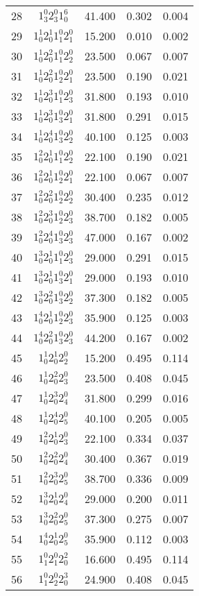 \begin{table}
\begin{tabular}{rcrrr}
28&$1_3^0 2_3^0 1_0^6$& 41.400& 0.302& 0.004\\
29&$1_0^1 2_0^1 1_1^0 2_1^0$& 15.200& 0.010& 0.002\\
30&$1_0^1 2_0^2 1_1^0 2_2^0$& 23.500& 0.067& 0.007\\
31&$1_0^1 2_0^2 1_2^0 2_1^0$& 23.500& 0.190& 0.021\\
32&$1_0^1 2_0^3 1_1^0 2_3^0$& 31.800& 0.193& 0.010\\
33&$1_0^1 2_0^3 1_3^0 2_1^0$& 31.800& 0.291& 0.015\\
34&$1_0^1 2_0^4 1_3^0 2_2^0$& 40.100& 0.125& 0.003\\
35&$1_0^2 2_0^1 1_1^0 2_2^0$& 22.100& 0.190& 0.021\\
36&$1_0^2 2_0^1 1_2^0 2_1^0$& 22.100& 0.067& 0.007\\
37&$1_0^2 2_0^2 1_2^0 2_2^0$& 30.400& 0.235& 0.012\\
38&$1_0^2 2_0^3 1_2^0 2_3^0$& 38.700& 0.182& 0.005\\
39&$1_0^2 2_0^4 1_3^0 2_3^0$& 47.000& 0.167& 0.002\\
40&$1_0^3 2_0^1 1_1^0 2_3^0$& 29.000& 0.291& 0.015\\
41&$1_0^3 2_0^1 1_3^0 2_1^0$& 29.000& 0.193& 0.010\\
42&$1_0^3 2_0^2 1_3^0 2_2^0$& 37.300& 0.182& 0.005\\
43&$1_0^4 2_0^1 1_2^0 2_3^0$& 35.900& 0.125& 0.003\\
44&$1_0^4 2_0^2 1_3^0 2_3^0$& 44.200& 0.167& 0.002\\
45&$1_0^1 2_0^1 2_2^0$& 15.200& 0.495& 0.114\\
46&$1_0^1 2_0^2 2_3^0$& 23.500& 0.408& 0.045\\
47&$1_0^1 2_0^3 2_4^0$& 31.800& 0.299& 0.016\\
48&$1_0^1 2_0^4 2_5^0$& 40.100& 0.205& 0.005\\
49&$1_0^2 2_0^1 2_3^0$& 22.100& 0.334& 0.037\\
50&$1_0^2 2_0^2 2_4^0$& 30.400& 0.367& 0.019\\
51&$1_0^2 2_0^3 2_5^0$& 38.700& 0.336& 0.009\\
52&$1_0^3 2_0^1 2_4^0$& 29.000& 0.200& 0.011\\
53&$1_0^3 2_0^2 2_5^0$& 37.300& 0.275& 0.007\\
54&$1_0^4 2_0^1 2_5^0$& 35.900& 0.112& 0.003\\
55&$1_1^0 2_1^0 2_0^2$& 16.600& 0.495& 0.114\\
56&$1_1^0 2_2^0 2_0^3$& 24.900& 0.408& 0.045\\

\end{tabular}
\end{table}
